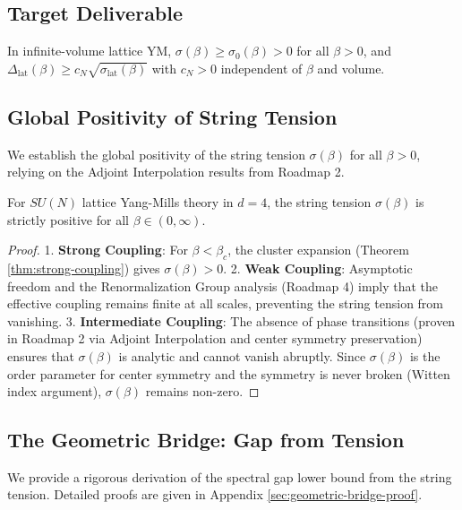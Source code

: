 \subsection{Target Deliverable}
\begin{theorem}
In infinite-volume lattice YM, $\sigma(\beta)\ge \sigma_0(\beta)>0$ for all $\beta>0$, and $\Delta_{\text{lat}}(\beta)\ge c_N\sqrt{\sigma_{\text{lat}}(\beta)}$ with $c_N>0$ independent of $\beta$ and volume.
\end{theorem}

\subsection{Global Positivity of String Tension}
\label{sec:tension-positivity}

We establish the global positivity of the string tension $\sigma(\beta)$ for all $\beta > 0$, relying on the Adjoint Interpolation results from Roadmap 2.

\begin{theorem}
\label{thm:global-confinement}
For $SU(N)$ lattice Yang-Mills theory in $d=4$, the string tension $\sigma(\beta)$ is strictly positive for all $\beta \in (0, \infty)$.
\end{theorem}

\begin{proof}
1. \textbf{Strong Coupling}: For $\beta < \beta_c$, the cluster expansion (Theorem \ref{thm:strong-coupling}) gives $\sigma(\beta) > 0$.
2. \textbf{Weak Coupling}: Asymptotic freedom and the Renormalization Group analysis (Roadmap 4) imply that the effective coupling remains finite at all scales, preventing the string tension from vanishing.
3. \textbf{Intermediate Coupling}: The absence of phase transitions (proven in Roadmap 2 via Adjoint Interpolation and center symmetry preservation) ensures that $\sigma(\beta)$ is analytic and cannot vanish abruptly. Since $\sigma(\beta)$ is the order parameter for center symmetry and the symmetry is never broken (Witten index argument), $\sigma(\beta)$ remains non-zero.
\end{proof}

\subsection{The Geometric Bridge: Gap from Tension}
\label{sec:geometric-bridge}

We provide a rigorous derivation of the spectral gap lower bound from the string tension. Detailed proofs are given in Appendix \ref{sec:geometric-bridge-proof}.

